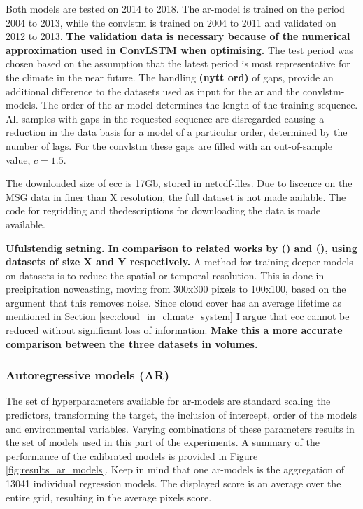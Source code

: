 Both models are tested on 2014 to 2018. The \acrshort{ar}-model is trained on the period 2004 to 2013, while the \acrshort{convlstm} is trained on  2004 to 2011 and validated on 2012 to 2013. \textbf{The validation data is necessary because of the numerical approximation used in ConvLSTM when optimising.} The test period was chosen based on the assumption that the latest period is most representative for the climate in the near future. The handling \textbf{(nytt ord)} of gaps, provide an additional difference to the datasets used as input for the \acrshort{ar} and the \acrshort{convlstm}-models. The order of the \acrshort{ar}-model determines the length of the training sequence. All samples with gaps in the requested sequence are disregarded causing a reduction in the data basis for a model of a particular order, determined by the number of lags. For the \acrshort{convlstm} these gaps are filled with an out-of-sample value, $c=1.5$. 

The downloaded size of \acrshort{ecc} is 17Gb, stored in \acrshort{netcdf}-files. Due to liscence on the MSG data in finer than X resolution, the full dataset is not made aailable. The code for regridding and thedescriptions for downloading the data is made available.

\textbf{Ufulstendig setning. In comparison to related works by \citeauthor{precip_nowcasting} (\citeyear{precip_nowcasting}) and \citeauthor{SunAirLSTM} (\citeyear{SunAirLSTM}), using datasets of size X and Y respectively.} A method for training deeper models on datasets is to reduce the spatial or temporal resolution. This is done in precipitation nowcasting, moving from 300x300 pixels to 100x100, based on the argument that this  removes noise. Since cloud cover has an average lifetime as mentioned in Section \ref{sec:cloud_in_climate_system} I argue that \acrshort{ecc} cannot be reduced without significant loss of information. \textbf{Make this a more accurate comparison between the three datasets in volumes.}

\subsubsection{Autoregressive models (AR)}
The set of hyperparameters available for \acrshort{ar}-models are
standard scaling the predictors, transforming the target, the inclusion of intercept, order of the models and environmental variables. Varying combinations of these parameters results in the set of models used in this part of the experiments. A summary of the performance of the calibrated models is provided in Figure \ref{fig:results_ar_models}. Keep in mind that one \acrshort{ar}-models is the aggregation of 13041 individual regression models. The displayed score is an average over the entire grid, resulting in the average pixels score.

